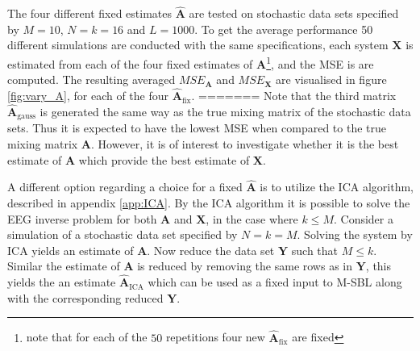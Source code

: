 The four different fixed estimates $\hat{\mathbf{A}}$ are tested on stochastic data sets specified by $M = 10$, $N = k = 16$ and $L = 1000$. 
To get the average performance 50 different simulations are conducted with the same specifications, each system $\textbf{X}$ is estimated from each of the four fixed estimates of $\textbf{A}$\footnote{note that for each of the $50$ repetitions  four new $\hat{\textbf{A}}_{\text{fix}}$ are fixed}, and the MSE is are computed. The resulting averaged $MSE_{\textbf{A}}$ and $MSE_{\textbf{X}}$ are visualised  in figure \ref{fig:vary_A}, for each of the four $\hat{\mathbf{A}}_{\text{fix}}$. 
=======
Note that the third matrix $\hat{\mathbf{A}}_{\text{gauss}}$ is generated the same way as the true mixing matrix of the stochastic data sets. 
Thus it is expected to have the lowest MSE when compared to the true mixing matrix $\mathbf{A}$. 
However, it is of interest to investigate whether it is the best estimate of $\mathbf{A}$ which provide the best estimate of $\mathbf{X}$.   

A different option regarding a choice for a fixed $\hat{\mathbf{A}}$ is to utilize the ICA algorithm, described in appendix \ref{app:ICA}. 
By the ICA algorithm it is possible to solve the EEG inverse problem for both $\mathbf{A}$ and $\mathbf{X}$, in the case where $k \leq M$.
Consider a simulation of a stochastic data set specified by $N = k = M$. 
Solving the system by ICA yields an estimate of $\mathbf{A}$. 
Now reduce the data set $\mathbf{Y}$ such that $M \leq k$. 
Similar the estimate of $\mathbf{A}$ is reduced by removing the same rows as in $\mathbf{Y}$, this yields the an estimate $\hat{\mathbf{A}}_{\text{ICA}}$ which can be used as a fixed input to M-SBL along with the corresponding reduced $\mathbf{Y}$.

